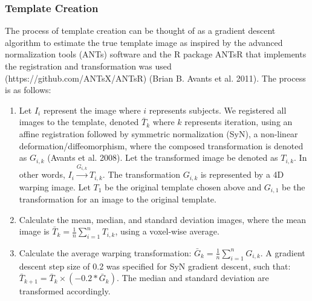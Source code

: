 \documentclass[]{elsarticle} %
\providecommand{\tightlist}{%
  \setlength{\itemsep}{0pt}\setlength{\parskip}{0pt}}
\begin{document}
\hypertarget{template-creation}{%
\subsubsection{Template Creation}\label{template-creation}}

The process of template creation can be thought of as a gradient descent algorithm to estimate the true template image as inspired by the advanced normalization tools (ANTs) software and the R package ANTsR that implements the registration and transformation was used (https://github.com/ANTsX/ANTsR) (Brian B. Avants et al. 2011). The process is as follows:

\begin{enumerate}
\def\labelenumi{\arabic{enumi}.}
\tightlist
\item
  Let \(I_{i}\) represent the image where \(i\) represents subjects. We registered all images to the template, denoted \(\bar{T}_{k}\) where \(k\) represents iteration, using an affine registration followed by symmetric normalization (SyN), a non-linear deformation/diffeomorphism, where the composed transformation is denoted as \(G_{i, k}\) (Avants et al. 2008). Let the transformed image be denoted as \(T_{i, k}\). In other words, \(I_{i}\overset{G_{i,k}}{\rightarrow}T_{i, k}\). The transformation \(G_{i, k}\) is represented by a 4D warping image. Let \(T_{1}\) be the original template chosen above and \(G_{i, 1}\) be the transformation for an image to the original template.
\item
  Calculate the mean, median, and standard deviation images, where the mean image is \(\bar{T}_{k} = \frac{1}{n} \sum\limits_{i = 1}^n T_{i, k}\), using a voxel-wise average.\\
\item
  Calculate the average warping transformation: \(\bar{G}_{k} = \frac{1}{n} \sum\limits_{i = 1}^n G_{i, k}\). A gradient descent step size of 0.2 was specified for SyN gradient descent, such that:
  \(\bar{T}_{k + 1} = \bar{T}_{k} \times \left(-0.2 * \bar{G}_{k}\right)\). The median and standard deviation are transformed accordingly.
\end{enumerate}
\end{document}
